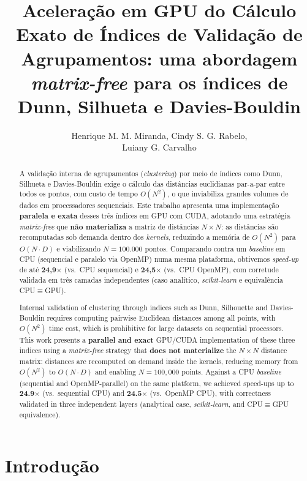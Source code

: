 \documentclass[12pt]{article}
\title{Aceleração em GPU do Cálculo Exato de Índices de Validação de
Agrupamentos: uma abordagem \emph{matrix-free} para os índices de
Dunn, Silhueta e Davies-Bouldin}
\author{Henrique M. M. Miranda, Cindy S. G. Rabelo,\\
Luiany G. Carvalho}
\newenvironment{resumo}{%
    \renewcommand{\abstractname}{Resumo}%
    \begin{abstract}}{\end{abstract}}%
\begin{document}
\maketitle

\begin{resumo}
A validação interna de agrupamentos (\emph{clustering}) por meio de índices
como Dunn, Silhueta e Davies-Bouldin exige o cálculo das distâncias
euclidianas par-a-par entre todos os pontos, com custo de tempo $O(N^2)$,
o que inviabiliza grandes volumes de dados em processadores sequenciais.
Este trabalho apresenta uma implementação \textbf{paralela e exata} desses
três índices em GPU com CUDA, adotando uma estratégia \emph{matrix-free}
que \textbf{não materializa} a matriz de distâncias $N\times N$: as
distâncias são recomputadas sob demanda dentro dos \emph{kernels}, reduzindo
a memória de $O(N^2)$ para $O(N\cdot D)$ e viabilizando $N=100.000$ pontos.
Comparando contra um \emph{baseline} em CPU (sequencial e paralelo via
OpenMP) numa mesma plataforma, obtivemos \emph{speed-up} de até
\textbf{24,9$\times$} (vs.\ CPU sequencial) e \textbf{24,5$\times$}
(vs.\ CPU OpenMP), com corretude validada em três camadas independentes
(caso analítico, \emph{scikit-learn} e equivalência CPU$\equiv$GPU).
\end{resumo}

\begin{abstract}
Internal validation of clustering through indices such as Dunn, Silhouette
and Davies-Bouldin requires computing pairwise Euclidean distances among all
points, with $O(N^2)$ time cost, which is prohibitive for large datasets on
sequential processors. This work presents a \textbf{parallel and exact}
GPU/CUDA implementation of these three indices using a \emph{matrix-free}
strategy that \textbf{does not materialize} the $N\times N$ distance matrix:
distances are recomputed on demand inside the kernels, reducing memory from
$O(N^2)$ to $O(N\cdot D)$ and enabling $N=100{,}000$ points. Against a CPU
\emph{baseline} (sequential and OpenMP-parallel) on the same platform, we
achieved speed-ups up to \textbf{24.9$\times$} (vs.\ sequential CPU) and
\textbf{24.5$\times$} (vs.\ OpenMP CPU), with correctness validated in three
independent layers (analytical case, \emph{scikit-learn}, and
CPU$\equiv$GPU equivalence).
\end{abstract}

\section{Introdução}
\end{document}

